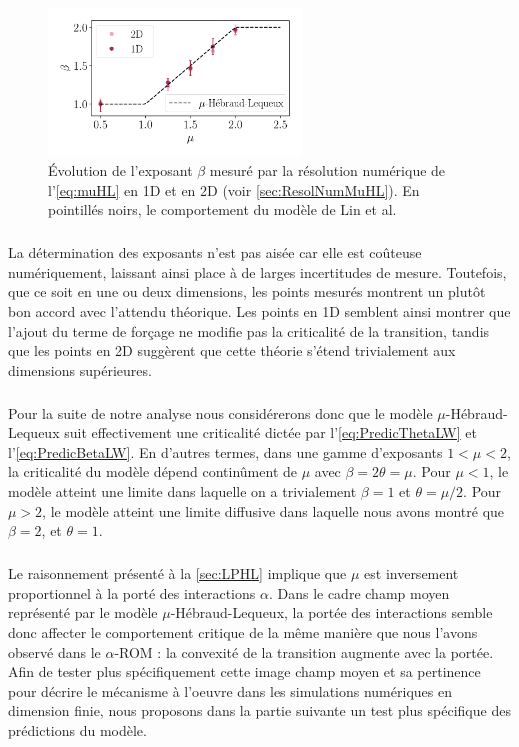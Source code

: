\begin{figure}[h]
	\centering
	\includegraphics[width=0.6\textwidth]{Chapitre3/Figures/Interpretation/beta_alpha_LevyHL2D.pdf}
	\caption{Évolution de l'exposant $\beta$ mesuré par la résolution numérique de l'\autoref{eq:muHL} en 1D et en 2D (voir \autoref{sec:ResolNumMuHL}). En pointillés noirs, le comportement du modèle de Lin et al. \cite{lin_microscopic_2018}}
	\label{fig:LHLNum}
\end{figure}

\subparagraph{}La détermination des exposants n'est pas aisée car elle est coûteuse numériquement, laissant ainsi place à de larges incertitudes de mesure. Toutefois, que ce soit en une ou deux dimensions, les points mesurés montrent un plutôt bon accord avec l'attendu théorique. Les points en 1D semblent ainsi montrer que l'ajout du terme de forçage ne modifie pas la criticalité de la transition, tandis que les points en 2D suggèrent que cette théorie s'étend trivialement aux dimensions supérieures.

\subparagraph{}Pour la suite de notre analyse nous considérerons donc que le modèle $\mu$-Hébraud-Lequeux suit effectivement une criticalité dictée par l'\autoref{eq:PredicThetaLW} et l'\autoref{eq:PredicBetaLW}. En d'autres termes, dans une gamme d'exposants $1<\mu<2$, la criticalité du modèle dépend continûment de $\mu$ avec $\beta = 2\theta = \mu$. Pour $\mu < 1$, le modèle atteint une limite dans laquelle on a trivialement $\beta = 1$ et $\theta = \mu/2$. Pour $\mu>2$, le modèle atteint une limite diffusive dans laquelle nous avons montré que $\beta = 2$, et $\theta = 1$.

\subparagraph{}Le raisonnement présenté à la \autoref{sec:LPHL} implique que $\mu$ est inversement proportionnel à la porté des interactions $\alpha$. Dans le cadre champ moyen représenté par le modèle $\mu$-Hébraud-Lequeux, la portée des interactions semble donc affecter le comportement critique de la même manière que nous l'avons observé dans le $\alpha$-ROM : la convexité de la transition augmente avec la portée. Afin de tester plus spécifiquement cette image champ moyen et sa pertinence pour décrire le mécanisme à l'oeuvre dans les simulations numériques en dimension finie, nous proposons dans la partie suivante un test plus spécifique des prédictions du modèle.


